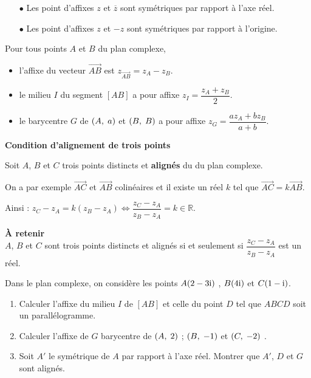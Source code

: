 \begin{remark}
\begin{itemize}
\item[$  \bullet$] Les point d'affixes $z $ et $\overline{z} $ sont symétriques par rapport à l'axe réel.
\item[$  \bullet$] Les point d'affixes $z $ et $-z $ sont symétriques par rapport à l'origine.
\end{itemize}
\end{remark} 
\begin{property}
Pour tous points $ A$ et $ B$  du plan complexe,
\begin{itemize}
\item  l'affixe du vecteur $ \overrightarrow{AB} $ \;  est  \; $ z_{\overrightarrow{AB}}=z_A-z_B $.
\item  le milieu $ I $ du segment $ [AB] $ a pour affixe $ z_I=\dfrac{z_A+z_B }{2} $.
\item le barycentre  $ G $ de $ \left(A,\; a\right) $ et $ \left(B,\; B\right) $ a pour affixe $ z_G=\dfrac{a z_A+b z_B }{a+b} $.
\end{itemize}
\end{property}

\medskip
\textbf{Condition d'alignement de trois points}

\medskip

Soit $ A$, $ B $   et $C $  trois points distincts et \textbf{alignés} du  du plan complexe. 

On a par exemple $\overrightarrow{AC} $ et $ \overrightarrow{AB}$  colinéaires et il existe un réel $ k $ tel que $\overrightarrow{AC}=k\overrightarrow{AB}$.

\medskip

Ainsi  : $ z_C-z_A= k(z_B-z_A) \Longleftrightarrow \dfrac{ z_C-z_A}{z_B-z_A}=k\in\mathbb{R}$.

\textbf{À retenir}\\
$ A$, $ B $   et $C $  sont trois points distincts et alignés  si et seulement si  $ \dfrac{ z_C-z_A}{z_B-z_A }$ est un réel.


\begin{exercice}
Dans le plan complexe, on considère les  points $ A(2-3\text{i}) $ , \; $ B(4\text{i}) $ et $ C(1-\text{i}) $.
\begin{enumerate}
\item Calculer l'affixe du milieu $ I $ de $ [AB] $ et celle du point $ D $ tel que   $ ABCD $ soit un parallélogramme.
\item Calculer l'affixe de $ G $ barycentre de  $ \left(A,\; 2\right) $ ;  $ \left(B,\; -1\right) $  et $ \left(C,\; -2\right) $ .
\item Soit $ A'$ le symétrique de  $ A $ par rapport à l'axe réel. Montrer que $ A'$, $  D$ et  $  G $ sont alignés.
\end{enumerate}
\end{exercice}
